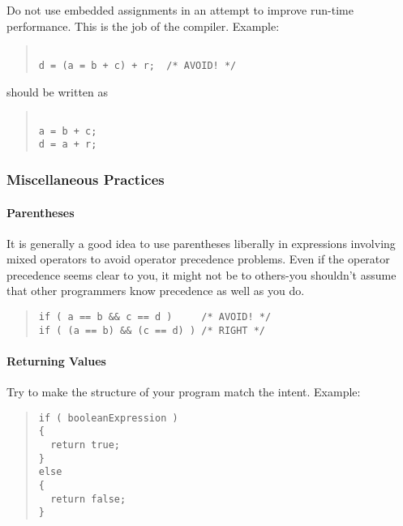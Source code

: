 \documentclass{article}
\begin{document}
Do not use embedded assignments in an attempt to improve run-time
performance. This is the job of the compiler. Example:

\begin{quote}
\begin{verbatim}

d = (a = b + c) + r;  /* AVOID! */

\end{verbatim}
\end{quote}

should be written as 

\begin{quote}
\begin{verbatim}

a = b + c;
d = a + r;

\end{verbatim}

\end{quote}

\subsubsection{Miscellaneous Practices}

\paragraph{Parentheses}

It is generally a good idea to use parentheses liberally in
expressions involving mixed operators to avoid operator precedence
problems. Even if the operator precedence seems clear to you, it might
not be to others-you shouldn't assume that other programmers know
precedence as well as you do.

\begin{quote}
\begin{verbatim}
if ( a == b && c == d )     /* AVOID! */
if ( (a == b) && (c == d) ) /* RIGHT */
\end{verbatim}
\end{quote}
 
\paragraph{Returning Values}

Try to make the structure of your program match the intent. Example:

\begin{quote}
\begin{verbatim}
if ( booleanExpression ) 
{
  return true;
} 
else 
{
  return false;
}
\end{verbatim}
\end{quote}
\end{document}
